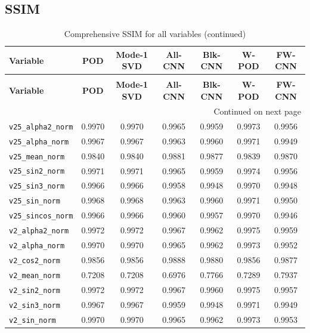 \documentclass{article}
\begin{document}
\subsection{SSIM}
\begin{longtable}{l cccccc}
\caption{Comprehensive SSIM for all variables.}\\
\toprule
\textbf{Variable} & \textbf{POD} & \textbf{Mode-1 SVD} & \textbf{All-CNN} & \textbf{Blk-CNN} & \textbf{W-POD} & \textbf{FW-CNN} \\
\midrule
\endfirsthead
\caption[]{Comprehensive SSIM for all variables (continued)}\\
\toprule
\textbf{Variable} & \textbf{POD} & \textbf{Mode-1 SVD} & \textbf{All-CNN} & \textbf{Blk-CNN} & \textbf{W-POD} & \textbf{FW-CNN} \\
\midrule
\endhead
\midrule
\multicolumn{7}{r}{{Continued on next page}} \\
\bottomrule
\endfoot
\bottomrule
\endlastfoot
\texttt{v25\_alpha2\_norm} & 0.9970 & 0.9970 & 0.9965 & 0.9959 & 0.9973 & 0.9956 \\
\texttt{v25\_alpha\_norm} & 0.9967 & 0.9967 & 0.9963 & 0.9960 & 0.9971 & 0.9949 \\
\texttt{v25\_mean\_norm} & 0.9840 & 0.9840 & 0.9881 & 0.9877 & 0.9839 & 0.9870 \\
\texttt{v25\_sin2\_norm} & 0.9971 & 0.9971 & 0.9965 & 0.9959 & 0.9974 & 0.9956 \\
\texttt{v25\_sin3\_norm} & 0.9966 & 0.9966 & 0.9958 & 0.9948 & 0.9970 & 0.9948 \\
\texttt{v25\_sin\_norm} & 0.9968 & 0.9968 & 0.9963 & 0.9960 & 0.9971 & 0.9950 \\
\texttt{v25\_sincos\_norm} & 0.9966 & 0.9966 & 0.9960 & 0.9957 & 0.9970 & 0.9946 \\
\texttt{v2\_alpha2\_norm} & 0.9972 & 0.9972 & 0.9967 & 0.9962 & 0.9975 & 0.9959 \\
\texttt{v2\_alpha\_norm} & 0.9970 & 0.9970 & 0.9965 & 0.9962 & 0.9973 & 0.9952 \\
\texttt{v2\_cos2\_norm} & 0.9856 & 0.9856 & 0.9888 & 0.9880 & 0.9856 & 0.9877 \\
\texttt{v2\_mean\_norm} & 0.7208 & 0.7208 & 0.6976 & 0.7766 & 0.7289 & 0.7937 \\
\texttt{v2\_sin2\_norm} & 0.9972 & 0.9972 & 0.9967 & 0.9960 & 0.9975 & 0.9957 \\
\texttt{v2\_sin3\_norm} & 0.9967 & 0.9967 & 0.9959 & 0.9948 & 0.9971 & 0.9949 \\
\texttt{v2\_sin\_norm} & 0.9970 & 0.9970 & 0.9965 & 0.9962 & 0.9973 & 0.9953 \\

\end{longtable}
\end{document}
